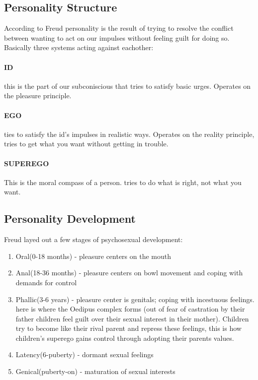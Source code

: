 \documentclass[12pt]{article}
\begin{document}
\subsection*{Personality Structure}
According to Freud personality is the result of trying to resolve the conflict between wanting to act on our impulses without feeling guilt for doing so. Basically three systems acting against eachother:
\paragraph*{ID} this is the part of our subconiscious that tries to satisfy basic urges. Operates on the pleasure principle.
\paragraph*{EGO} ties to satisfy the id's impulses in realistic ways. Operates on the reality principle, tries to get what you want without getting in trouble.
\paragraph*{SUPEREGO} This is the moral compass of a person. tries to do what is right, not what you want.
\subsection*{Personality Development}
Freud layed out a few stages of psychosexual development:
\begin{enumerate}
\item Oral(0-18 months) - pleasure centers on the mouth
\item Anal(18-36 months) - pleasure centers on bowl movement and coping with demands for control
\item Phallic(3-6 years) - pleasure center is genitals; coping with incestuous feelings. here is where the Oedipus complex forms (out of fear of castration by their father children feel guilt over their sexual interest in their mother). Children try to become like their rival parent and repress these feelings, this is how children's superego gains control through adopting their parents values. 
\item Latency(6-puberty) - dormant sexual feelings
\item Genical(puberty-on) - maturation of sexual interests
\end{enumerate}
\end{document}
